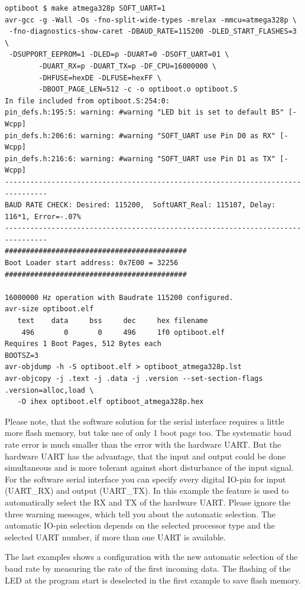 \begin{verbatim}
optiboot $ make atmega328p SOFT_UART=1
avr-gcc -g -Wall -Os -fno-split-wide-types -mrelax -mmcu=atmega328p \
 -fno-diagnostics-show-caret -DBAUD_RATE=115200 -DLED_START_FLASHES=3 \
 -DSUPPORT_EEPROM=1 -DLED=p -DUART=0 -DSOFT_UART=01 \
        -DUART_RX=p -DUART_TX=p -DF_CPU=16000000 \
        -DHFUSE=hexDE -DLFUSE=hexFF \
        -DBOOT_PAGE_LEN=512 -c -o optiboot.o optiboot.S
In file included from optiboot.S:254:0:
pin_defs.h:195:5: warning: #warning "LED bit is set to default B5" [-Wcpp]
pin_defs.h:206:6: warning: #warning "SOFT_UART use Pin D0 as RX" [-Wcpp]
pin_defs.h:216:6: warning: #warning "SOFT_UART use Pin D1 as TX" [-Wcpp]
--------------------------------------------------------------------------------
BAUD RATE CHECK: Desired: 115200,  SoftUART_Real: 115107, Delay: 116*1, Error=-.07%
--------------------------------------------------------------------------------
###########################################
Boot Loader start address: 0x7E00 = 32256
###########################################

16000000 Hz operation with Baudrate 115200 configured.
avr-size optiboot.elf
   text	   data	    bss	    dec	    hex	filename
    496	      0	      0	    496	    1f0	optiboot.elf
Requires 1 Boot Pages, 512 Bytes each
BOOTSZ=3
avr-objdump -h -S optiboot.elf > optiboot_atmega328p.lst
avr-objcopy -j .text -j .data -j .version --set-section-flags .version=alloc,load \
   -O ihex optiboot.elf optiboot_atmega328p.hex
\end{verbatim}

Please note, that the software solution for the serial interface requires a little more flash memory,
but take use of only 1 boot page too. The systematic baud rate error is much smaller than the error with the hardware UART.
But the hardware UART has the advantage, that the input and output could be done simultaneous and is more tolerant against
short disturbance of the input signal.
For the software serial interface you can specify every digital IO-pin for input (UART\_RX) and output (UART\_TX). 
In this example the feature is used to automatically select the RX and TX of the hardware UART.
Please ignore the three warning messages, which tell you about the automatic selection.
The automatic IO-pin selection depends on the selected processor type and the selected UART number, if more than
one UART is available.


The last examples shows a configuration with the new automatic selection of the baud rate
by measuring the rate of the first incoming data.
The flashing of the LED at the program start is deselected in the first example to save flash memory.

